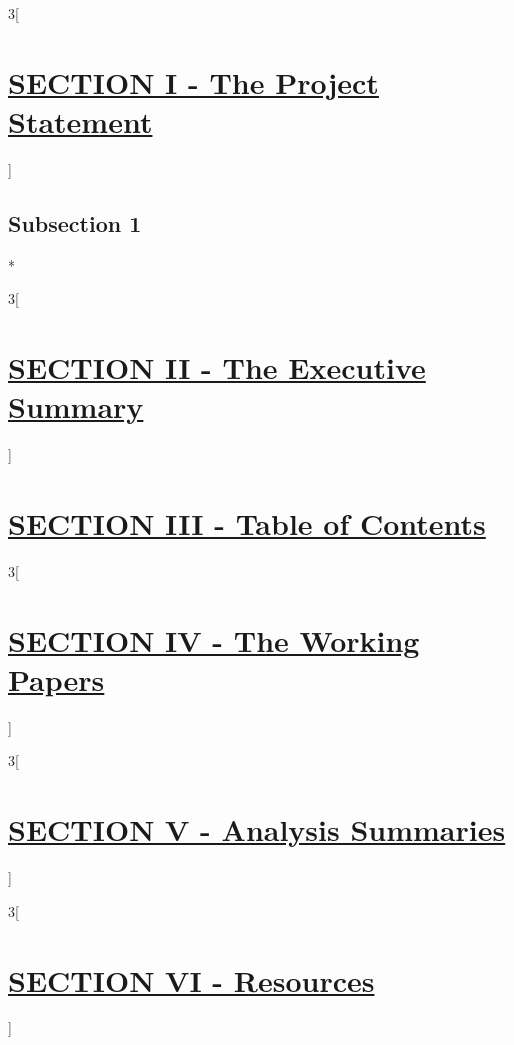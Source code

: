 \documentclass[11pt,a4paper,numbers=noenddot]{scrartcl}
\numberwithin{equation}{section}
\begin{document}


\begin{paracol}{3}[\section{\underline{SECTION I - The Project Statement}}]
	\switchcolumn[0]
	\subsection{Subsection 1}\label{subsec:first}
	\switchcolumn[1]
	\lipsum[1]
	
	\switchcolumn[1]*
	\lipsum[2]
\end{paracol}

\begin{paracol}{3}[\section{\underline{SECTION II - The Executive Summary}}]

\end{paracol}

\newpage
\section{\underline{SECTION III - Table of Contents}}
\tableofcontents
	
\newpage
\begin{paracol}{3}[\section{\underline{SECTION IV - The Working Papers}}]
	
\end{paracol}

\newpage
\begin{paracol}{3}[\section{\underline{SECTION V - Analysis Summaries}}]
	
\end{paracol}

\newpage
\begin{paracol}{3}[\section{\underline{SECTION VI - Resources}}]
	
\end{paracol}
\end{document}
